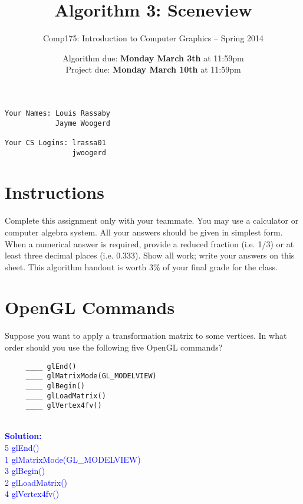 \documentclass[10pt,twocolumn]{article}
\title{\Huge{\bf Algorithm 3: Sceneview}}
\author{Comp175: Introduction to Computer Graphics -- Spring 2014}
\date{Algorithm due:  {\bf Monday March 3th} at 11:59pm\\
Project due:  {\bf Monday March 10th} at 11:59pm}
\newcommand{\solution}[1]{\textcolor{Blue}{\\{\bf Solution:} \\ #1}}  %
\begin{document}
\maketitle

\begin{verbatim}
Your Names: Louis Rassaby
            Jayme Woogerd

Your CS Logins: lrassa01
                jwoogerd
\end{verbatim}


\section{Instructions}
Complete this assignment only with your teammate. You may use a
calculator or computer algebra system. All your answers should be given in simplest form.
When a numerical answer is required, provide a reduced fraction (i.e. 1/3) or at least three
decimal places (i.e. 0.333). Show all work; write your answers on this sheet. This algorithm handout is worth 3\% of your final grade for the class.

\section{OpenGL Commands}
\begin{framed}
 Suppose you want to apply a transformation matrix to some vertices. In what order should you use the following five OpenGL commands?
\begin{verbatim}
     ____ glEnd()
     ____ glMatrixMode(GL_MODELVIEW)
     ____ glBegin()
     ____ glLoadMatrix()
     ____ glVertex4fv()
\end{verbatim}
\pagebreak
\solution{
5 glEnd()\\
1 glMatrixMode(GL\_MODELVIEW)\\
3 glBegin()\\
2 glLoadMatrix()\\
4 glVertex4fv()
}
\end{framed}
\end{document}
